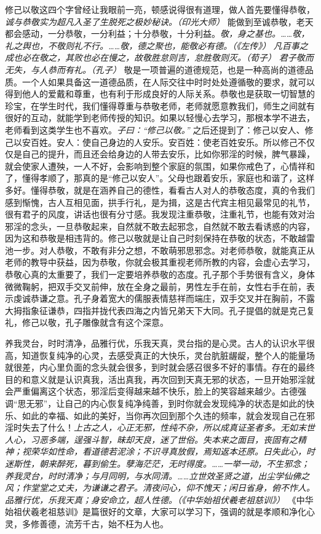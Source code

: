 修己以敬这四个字曾经让我眼前一亮，顿感说得很有道理，做人首先要懂得恭敬，\textit{诚与恭敬实为超凡入圣了生脱死之极妙秘诀。（印光大师）} 能做到至诚恭敬，老天都会感动，一分恭敬，一分利益；十分恭敬，十分利益。\textit{敬，身之基也。……敬，礼之舆也，不敬则礼不行。……敬，德之聚也，能敬必有德。（《左传》）} \textit{凡百事之成也必在敬之，其败也必在慢之，故敬胜怠则吉，怠胜敬则灭。（荀子）} \textit{君子敬而无失，与人恭而有礼。（孔子）} 敬是一项普遍的道德规范，也是一种高尚的道德品质。一个人如果具备这一道德品质，在人际交往中时时处处遵循敬的要求，就可以得到他人的爱戴和尊重，也有利于形成良好的人际关系。恭敬也是获取一切智慧的珍宝，在学生时代，我们懂得尊重与恭敬老师，老师就愿意教我们，师生之间就有很好的互动，就能学到老师传授的知识。如果以轻慢心去学习，那根本学不进去，老师看到这类学生也不喜欢。\textit{子曰：“修己以敬。”} 之后还提到了：修己以安人、修己以安百姓。安人：使自己身边的人安乐。安百姓：使老百姓安乐。所以修己不仅仅是自己的提升，而且还会给身边的人带去安乐，比如你邪淫的时候，脾气暴躁，就会使家人遭殃，一人不好，会影响到整个家庭的氛围，如果你戒色了，心情祥和了，懂得孝顺了，那真的是“修己以安人”。父母也跟着安乐，家庭也和谐了，这样多好。懂得恭敬，就是在涵养自己的德性，看看古人对人的恭敬态度，真的令我们感到惭愧，古人互相见面，拱手行礼，是为揖，这是古代宾主相见最常见的礼节，很有君子的风度，讲话也很有分寸感。我发现注重恭敬，注重礼节，也能有效对治邪淫的念头，一旦恭敬起来，自然就不敢去起邪念，自然就不敢去看诱惑的内容，因为这和恭敬是相违背的。修己以敬就是让自己时刻保持在恭敬的状态，不敢越雷池一步。对人恭敬，不敢有非分之想，不敢萌邪思邪念。对老师恭敬，就能真正从老师的教导中获益，因为恭敬，你就会极其重视老师所教的内容，会虚心去学习，恭敬心真的太重要了，我们一定要培养恭敬的态度。孔子那个手势很有含义，身体微微鞠躬，把双手交叉前伸，放在全身之最前，男性左手在前，女性右手在前，表示虔诚恭谦之意。孔子身着宽大的儒服表情慈祥而端庄，双手交叉并在胸前，不露大拇指象征谦恭，四指并拢代表四海之内皆兄弟天下大同。孔子提倡的就是克己复礼，修己以敬，孔子雕像就含有这个深意。

养我灵台，时时清净，品雅行优，乐我天真，灵台指的是心灵。古人的认识水平很高，知道恢复纯净的心灵，去感受真正的大快乐，灵台肮脏龌龊，整个人的能量场就很差，内心里负面的念头就会很多，到时就会感召很多不好的事情。存在的最终目的和意义就是认识真我，活出真我，再次回到天真无邪的状态，一旦开始邪淫就会严重偏离这个状态，邪淫后变得越来越不快乐，脸上的笑容越来越少。古德强调“思无邪”，让自己的内心恢复纯净纯善，到时你就会发现纯净的状态是如此的快乐、如此的幸福、如此的美好，当你再次回到那个久违的频率，就会发现自己在邪淫时失去了什么！\textit{上古之人，心正无邪，性纯不杂，所以成真证圣者多。无如末世人心，习恶多端，逞强斗智，昧却天良，迷了世俗。失本来之面目，丧固有之精神；视荣华如性命，看道德若泥涂；不识寻真放假，焉知返本还原。日失此心，时迷斯性，朝来醉死，暮到偷生。孽海茫茫，无时得度。……一举一动，不生邪念；养我灵台，时时清净；与月同明，与水同清。……立世效圣贤之道，出尘学仙佛之风；作堂堂之丈夫，为谦谦之君子。清夜问心，仰不愧天；闲日省身，俯不怍人。品雅行优，乐我天真；身安命立，超人性德。（《中华始祖伏羲老祖慈训》）} 《中华始祖伏羲老祖慈训》是篇很好的文章，大家可以学习下，强调的就是孝顺和净化心灵，多修善德，流芳千古，始不枉为人也。

